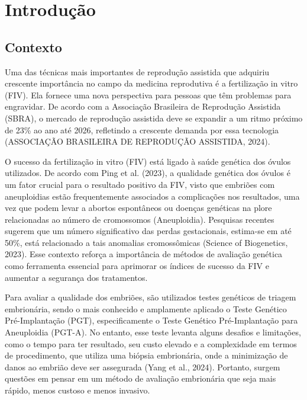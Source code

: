 \chapter[Introdução]{Introdução}

\section{Contexto}

Uma das técnicas mais importantes de reprodução assistida que adquiriu crescente importância no campo da medicina reprodutiva é a fertilização in vitro (FIV). Ela fornece uma nova perspectiva para pessoas que têm problemas para engravidar. De acordo com a Associação Brasileira de Reprodução Assistida (SBRA), o mercado de reprodução assistida deve se expandir a um ritmo próximo de 23\% ao ano até 2026, refletindo a crescente demanda por essa tecnologia (ASSOCIAÇÃO BRASILEIRA DE REPRODUÇÃO ASSISTIDA, 2024).

O sucesso da fertilização in vitro (FIV) está ligado à saúde genética dos óvulos utilizados. De acordo com Ping et al. (2023), a qualidade genética dos óvulos é um fator crucial para o resultado positivo da FIV, visto que embriões com aneuploidias estão frequentemente associados a complicações nos resultados, uma vez que podem levar a abortos espontâneos ou doenças genéticas na plore relacionadas ao número de cromossomos (Aneuploidia). Pesquisas recentes sugerem que um número significativo das perdas gestacionais, estima-se em até 50\%, está relacionado a tais anomalias cromossômicas (Science of Biogenetics, 2023). Esse contexto reforça a importância de métodos de avaliação genética como ferramenta essencial para aprimorar os índices de sucesso da FIV e aumentar a segurança dos tratamentos.

Para avaliar a qualidade dos embriões, são utilizados testes genéticos de triagem embrionária, sendo o mais conhecido e amplamente aplicado o Teste Genético Pré-Implantação (PGT), especificamente o Teste Genético Pré-Implantação para Aneuploidia (PGT-A). No entanto, esse teste levanta alguns desafios e limitações, como o tempo para ter resultado, seu custo elevado e a complexidade em termos de procedimento, que utiliza uma biópsia embrionária, onde a minimização de danos ao embrião deve ser assegurada (Yang et al., 2024). Portanto, surgem questões em pensar em um método de avaliação embrionária que seja mais rápido,  menos custoso e menos invasivo. 


